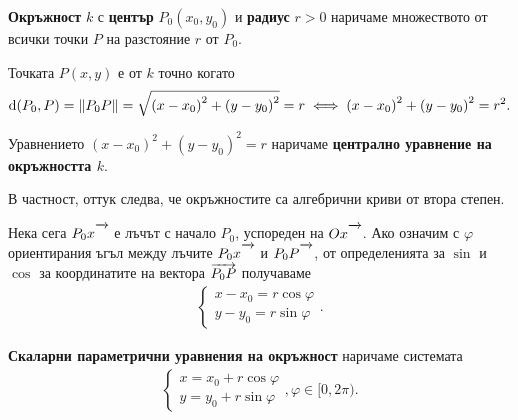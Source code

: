 \documentclass[numbers=endperiod, bibliography=totocnumbered]{scrartcl}
\begin{document}
\begin{definition}
  \textbf{Окръжност} \( k \) с \textbf{център} \( P_0(x_0, y_0) \) и \textbf{радиус} \( r > 0 \) наричаме множеството от всички точки \( P \) на разстояние \( r \) от \( P_0 \).

  Точката \( P(x, y) \) е от \( k \) точно когато
  \begin{align*}
    \operatorname{d}(P_0, P)
    =
    \left\Vert P_0 P \right\Vert
    =
    \sqrt{{(x - x_0)}^2 + {(y - y_0)}^2} = r
    \iff
    {(x - x_0)}^2 + {(y - y_0)}^2 = r^2.
  \end{align*}

  Уравнението \( {(x - x_0)}^2 + {(y - y_0)}^2 = r \) наричаме \textbf{централно уравнение на окръжността \( k \)}.

  В частност, оттук следва, че окръжностите са алгебрични криви от втора степен.

  \bigskip
  \begin{minipage}{0.45\textwidth}
    Нека сега \( P_0 x\Ray \) е лъчът с начало \( P_0 \), успореден на \( Ox\Ray \). Ако означим с \( \varphi \) ориентирания ъгъл между лъчите \( P_0x\Ray \) и \( P_0 P\Ray \), от определенията за \( \sin \) и \( \cos \) за координатите на вектора \( \overrightarrow{P_0 P} \) получаваме
    \begin{align*}
      \begin{cases}
        x - x_0 = r \cos \varphi \\
        y - y_0 = r \sin \varphi
      \end{cases}.
    \end{align*}

    \textbf{Скаларни параметрични уравнения на окръжност} наричаме системата
    \begin{align*}
      \begin{cases}
        x = x_0 + r \cos \varphi \\
        y = y_0 + r \sin \varphi
      \end{cases},
      \varphi \in [0, 2\pi).
    \end{align*}
  \end{minipage}
  \begin{minipage}{0.45\textwidth}
    \begin{figure}[H]
      \begin{Center}
\end{Center}
\end{figure}
\end{minipage}
\end{definition}
\end{document}
